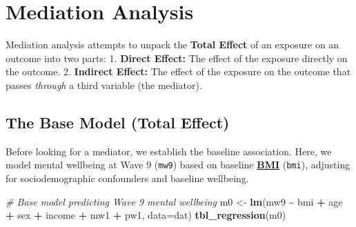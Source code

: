 \documentclass[
]{book}
\newenvironment{Shaded}{\begin{snugshade}}{\end{snugshade}}
\newcommand{\AttributeTok}[1]{\textcolor[rgb]{0.13,0.29,0.53}{#1}}
\newcommand{\CommentTok}[1]{\textcolor[rgb]{0.56,0.35,0.01}{\textit{#1}}}
\newcommand{\FunctionTok}[1]{\textcolor[rgb]{0.13,0.29,0.53}{\textbf{#1}}}
\newcommand{\NormalTok}[1]{#1}
\newcommand{\OtherTok}[1]{\textcolor[rgb]{0.56,0.35,0.01}{#1}}
\newcommand{\SpecialCharTok}[1]{\textcolor[rgb]{0.81,0.36,0.00}{\textbf{#1}}}
\begin{document}
\section{Mediation Analysis}\label{mediation-analysis}

Mediation analysis attempts to unpack the \textbf{Total Effect} of an exposure on an outcome into two parts:
1. \textbf{Direct Effect:} The effect of the exposure directly on the outcome.
2. \textbf{Indirect Effect:} The effect of the exposure on the outcome that passes \emph{through} a third variable (the mediator).

\subsection{The Base Model (Total Effect)}\label{the-base-model-total-effect}

Before looking for a mediator, we establish the baseline association. Here, we model mental wellbeing at Wave 9 (\texttt{mw9}) based on baseline \textbf{\hyperref[acronyms_BMI]{BMI}} (\texttt{bmi}), adjusting for sociodemographic confounders and baseline wellbeing.

\begin{Shaded}
\begin{Highlighting}[]
\CommentTok{\# Base model predicting Wave 9 mental wellbeing}
\NormalTok{m0 }\OtherTok{\textless{}{-}} \FunctionTok{lm}\NormalTok{(mw9 }\SpecialCharTok{\textasciitilde{}}\NormalTok{ bmi }\SpecialCharTok{+}\NormalTok{ age }\SpecialCharTok{+}\NormalTok{ sex }\SpecialCharTok{+}\NormalTok{ income }\SpecialCharTok{+}\NormalTok{ mw1 }\SpecialCharTok{+}\NormalTok{ pw1, }\AttributeTok{data=}\NormalTok{dat)}
\FunctionTok{tbl\_regression}\NormalTok{(m0)}
\end{Highlighting}
\end{Shaded}
\end{document}
